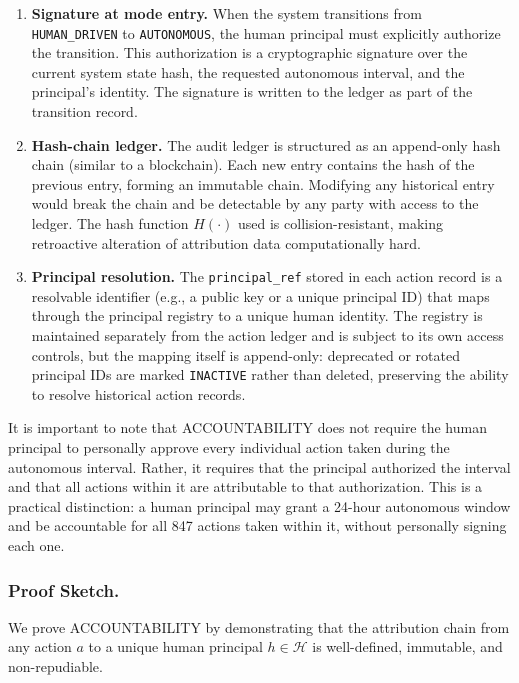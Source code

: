 \begin{enumerate}
    \item \textbf{Signature at mode entry.} When the system transitions from \texttt{HUMAN\_DRIVEN} to \texttt{AUTONOMOUS}, the human principal must explicitly authorize the transition. This authorization is a cryptographic signature over the current system state hash, the requested autonomous interval, and the principal's identity. The signature is written to the ledger as part of the transition record.
    \item \textbf{Hash-chain ledger.} The audit ledger is structured as an append-only hash chain (similar to a blockchain). Each new entry contains the hash of the previous entry, forming an immutable chain. Modifying any historical entry would break the chain and be detectable by any party with access to the ledger. The hash function $H(\cdot)$ used is collision-resistant, making retroactive alteration of attribution data computationally hard.
    \item \textbf{Principal resolution.} The \texttt{principal\_ref} stored in each action record is a resolvable identifier (e.g., a public key or a unique principal ID) that maps through the principal registry to a unique human identity. The registry is maintained separately from the action ledger and is subject to its own access controls, but the mapping itself is append-only: deprecated or rotated principal IDs are marked \texttt{INACTIVE} rather than deleted, preserving the ability to resolve historical action records.
\end{enumerate}

It is important to note that ACCOUNTABILITY does not require the human principal to personally approve every individual action taken during the autonomous interval. Rather, it requires that the principal authorized the interval and that all actions within it are attributable to that authorization. This is a practical distinction: a human principal may grant a 24-hour autonomous window and be accountable for all 847 actions taken within it, without personally signing each one.

\subsubsection*{Proof Sketch.}
We prove ACCOUNTABILITY by demonstrating that the attribution chain from any action $a$ to a unique human principal $h \in \mathcal{H}$ is well-defined, immutable, and non-repudiable.

